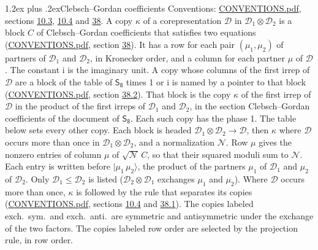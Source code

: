 \documentclass[10pt,a4paper]{article}
\makeatletter
\renewcommand\section{\@startsection{section}{1}{\z@}{-3ex plus -1ex minus -.2ex}%
  {1.2ex plus .2ex}{\normalfont\large\sffamily\bfseries\color{parttitle}}}
\numberwithin{equation}{section}
\newcommand{\grp}[1]{\mathsf{#1}}
\newcommand{\iunit}{\mathrm{i}}
\newcommand{\irrprod}{\otimes}
\newcommand{\mult}{\kappa}
\newcommand{\intx}{\mu}
\newcommand{\cgnorm}{\mathcal{N}}
\newcommand{\prodket}[2]{\lvert {#1}\,{#2}\rangle}
\makeatother
\begin{document}
\section{Clebsch--Gordan coefficients}\label{s:clebsch_gordan}
Conventions: \href{../../CONVENTIONS.pdf}{CONVENTIONS.pdf}, sections \href{../../../rotation/CONVENTIONS.pdf\#conv.10.3}{10.3}, \href{../../../rotation/CONVENTIONS.pdf\#conv.10.4}{10.4} and \href{../../CONVENTIONS.pdf\#conv.38}{38}.
\leavevmode\label{n:index.copy}\label{n:matrix.cg.stored}A copy $\mult$ of a corepresentation $\mathcal{D}$ in $\mathcal{D}_1\irrprod\mathcal{D}_2$ is a block $C$ of Clebsch--Gordan coefficients that satisfies two equations (\href{../../CONVENTIONS.pdf}{CONVENTIONS.pdf}, section \href{../../CONVENTIONS.pdf\#conv.38}{38}). \label{n:index.cg}It has a row for each pair $(\intx_1, \intx_2)$ of partners of $\mathcal{D}_1$ and $\mathcal{D}_2$, in Kronecker order, and a column for each partner $\intx$ of $\mathcal{D}$.
The constant $\iunit$ is the imaginary unit.
A copy whose columns of the first irrep of $\mathcal{D}$ are a block of the table of $\grp{S_{8}}$ times 1 or $\iunit$ is named by a pointer to that block (\href{../../CONVENTIONS.pdf}{CONVENTIONS.pdf}, section \href{../../CONVENTIONS.pdf\#conv.38.2}{38.2}). That block is the copy $\mult$ of the first irrep of $\mathcal{D}$ in the product of the first irreps of $\mathcal{D}_1$ and $\mathcal{D}_2$, in the section Clebsch--Gordan coefficients of the document of \href{../../../rotation/data/pdf/S8.pdf}{$\grp{S_{8}}$}. Each such copy has the phase 1. The table below sets every other copy.
Each block is headed $\mathcal{D}_1\irrprod\mathcal{D}_2\to\mathcal{D}$, then $\mult$ where $\mathcal{D}$ occurs more than once in $\mathcal{D}_1\irrprod\mathcal{D}_2$, and a normalization $\cgnorm$. Row $\intx$ gives the nonzero entries of column $\intx$ of $\sqrt{\cgnorm}\,C$, so that their squared moduli sum to $\cgnorm$. \label{n:vector.ket.product}Each entry is written before $\prodket{\intx_1}{\intx_2}$, the product of the partners $\intx_1$ of $\mathcal{D}_1$ and $\intx_2$ of $\mathcal{D}_2$. Only $\mathcal{D}_1 \le \mathcal{D}_2$ is listed ($\mathcal{D}_2\irrprod\mathcal{D}_1$ exchanges $\intx_1$ and $\intx_2$).
Where $\mathcal{D}$ occurs more than once, $\mult$ is followed by the rule that separates its copies (\href{../../CONVENTIONS.pdf}{CONVENTIONS.pdf}, sections \href{../../../rotation/CONVENTIONS.pdf\#conv.10.4}{10.4} and \href{../../CONVENTIONS.pdf\#conv.38.1}{38.1}). \label{n:abbreviation.exchange}The copies labeled exch.\ sym.\ and exch.\ anti.\ are symmetric and antisymmetric under the exchange of the two factors. The copies labeled row order are selected by the projection rule, in row order.
\end{document}
